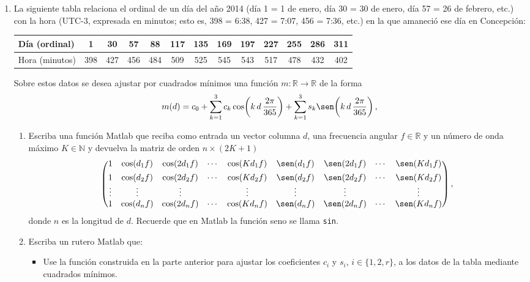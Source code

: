 \documentclass[letterpaper,11pt]{article}
\newcommand{\matlab}{{\sc Matlab} }
\begin{document}
\begin{enumerate}
\item La siguiente tabla relaciona el ordinal de un d\'ia del a\~no 2014 (d\'ia 1 = 1 de enero, d\'ia 30 = 30 de enero, d\'ia 57 = 26 de febrero, etc.) con la hora (UTC-3, expresada en minutos; esto es, 398 = 6:38, 427 = 7:07, 456 = 7:36, etc.) en la que amaneci\'o ese d\'ia en Concepci\'on:
\smallskip
\begin{center}\small
\begin{tabular}{|l|c|c|c|c|c|c|c|c|c|c|c|c|}\hline
D\'ia (ordinal)  &1   &30  &57  &88  &117 &135 &169 &197 &227 &255 &286 &311 \\\hline
Hora (minutos) &398 &427 &456 &484 &509 &525 &545 &543 &517 &478 &432 &402 \\\hline
\end{tabular}
\end{center}
\smallskip
%
Sobre estos datos se desea ajustar por cuadrados m\'inimos una funci\'on $m\colon\mathbb{R} \to \mathbb{R}$ de la forma
%
\begin{equation*}
m(d) = c_0 + \sum_{k=1}^3 c_k \cos\!\left(k \, d \, \frac{2\pi}{365}\right) + \sum_{k=1}^3 s_k \sen\!\left( k\, d \, \frac{2\pi}{365} \right),
\end{equation*}
%
\begin{enumerate}
\item %
Escriba una funci\'on Matlab que reciba como entrada un vector columna $d$, una frecuencia angular
$f \in \mathbb{R}$ y un n\'umero de onda m\'aximo $K \in \mathbb{N}$ y  devuelva la matriz de orden $n \times (2K+1)$
%
\begin{equation*}
\begin{pmatrix}
1 & \cos\!\left(d_1 f \right) & \cos\!\left(2 d_1 f \right) & \cdots & \cos\!\left(K d_1 f \right) & \sen\!\left(d_1 f \right) & \sen\!\left(2 d_1 f \right) & \cdots & \sen\!\left(K d_1 f \right)\vspace{1ex}\\
1 & \cos\!\left(d_2 f \right) & \cos\!\left(2 d_2 f \right) & \cdots & \cos\!\left(K d_2 f \right) & \sen\!\left(d_2 f \right) & \sen\!\left(2 d_2 f \right) & \cdots & \sen\!\left(K d_2 f \right)\\
\vdots & \vdots & \vdots && \vdots & \vdots & \vdots & & \vdots\\
1 & \cos\!\left(d_n f \right) & \cos\!\left(2 d_n f \right) & \cdots & \cos\!\left(K d_n f \right) & \sen\!\left(d_n f \right) & \sen\!\left(2 d_n f \right) & \cdots & \sen\!\left(K d_n f \right)
\end{pmatrix},
\end{equation*}
%
donde $n$ es la longitud de $d$.
Recuerde que en \matlab la funci\'on seno se llama \texttt{sin}.
\bigskip
\item Escriba un rutero Matlab que:
\begin{itemize}
\item Use la funci\'on construida en la parte anterior para ajustar los coeficientes $c_i$ y $s_i$, $i \in \{1, 2, r\}$, a los datos de la tabla mediante cuadrados m\'inimos.


\end{itemize}
\end{enumerate}
\end{enumerate}
\end{document}
